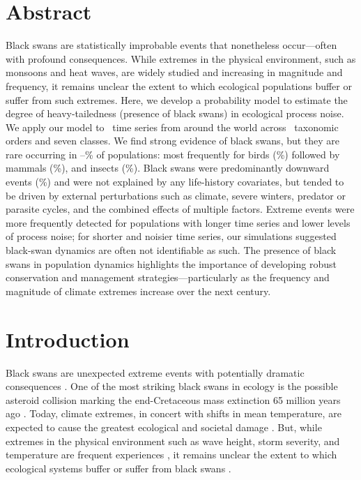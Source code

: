 
\section{Abstract}

Black swans are statistically improbable events that nonetheless occur---often with profound consequences. While extremes in the physical environment, such as monsoons and heat waves, are widely studied and increasing in magnitude and frequency, it remains unclear the extent to which ecological populations buffer or suffer from such extremes. Here, we develop a probability model to estimate the degree of heavy-tailedness (presence of black swans) in ecological process noise. We apply our model to \NPops~time series from around the world across \NOrders~taxonomic orders and seven classes. We find strong evidence of black swans, but they are rare occurring in \overallMinPerc--\overallMaxPerc\% of populations: most frequently for birds (\AvesRangePerc\%) followed by mammals (\MammaliaRangePerc\%), and insects (\InsectaRangePerc\%). Black swans were predominantly downward events (\percBSDown \%) and were not explained by any life-history covariates, but tended to be driven by external perturbations such as climate, severe winters, predator or parasite cycles, and the combined effects of multiple factors. Extreme events were more frequently detected for populations with longer time series and lower levels of process noise; for shorter and noisier time series, our simulations suggested black-swan dynamics are often not identifiable as such. The presence of black swans in population dynamics highlights the importance of developing robust conservation and management strategies---particularly as the frequency and magnitude of climate extremes increase over the next century.


\section{Introduction}

Black swans are unexpected extreme events with potentially dramatic consequences \citep{taleb2007,sornette2009}. One of the most striking black swans in ecology is the possible asteroid collision marking the end-Cretaceous mass extinction 65 million years ago \citep{alvarez1980,harnik2012}. Today, climate extremes, in concert with shifts in mean temperature, are expected to cause the greatest ecological and societal damage \citep{ipcc2012}. But, while extremes in the physical environment such as wave height, storm severity, and temperature are frequent experiences \citep{gaines1993,katz2005}, it remains unclear the extent to which ecological systems buffer or suffer from black swans \citep{nunez2012}.

